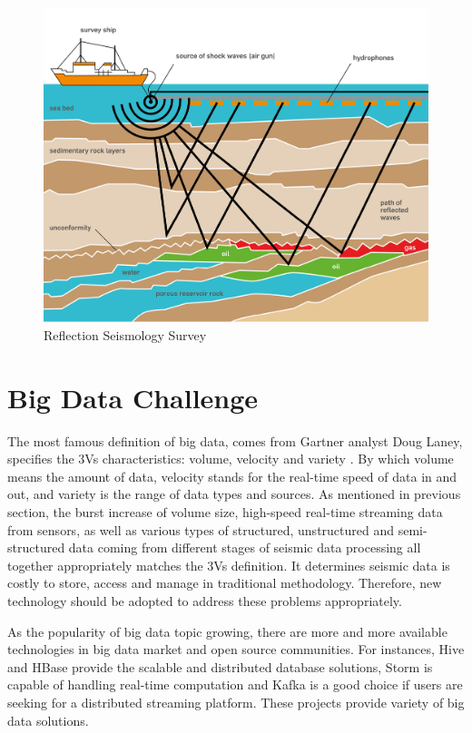 \begin{figure}[h]
\centering
\includegraphics[scale=1.0]{figures/Seissurvey.jpg}
\caption{Reflection Seismology Survey \cite{seisaov}}
\label{seismic_reflection}
\end{figure}

\section{Big Data Challenge}

The most famous definition of big data, comes from Gartner analyst Doug Laney, specifies the 3Vs characteristics: volume, velocity and variety \cite{demauro2016}. By which volume means the amount of data, velocity stands for the real-time speed of data in and out, and variety is the range of data types and sources. As mentioned in previous section,  the burst increase of volume size, high-speed real-time streaming data from sensors, as well as various types of structured, unstructured and semi-structured data coming from different stages of seismic data processing all together appropriately matches the 3Vs definition. It determines seismic data is costly to store, access and manage in traditional methodology. Therefore, new technology should be adopted to address these problems appropriately.

As the popularity of big data topic growing, there are more and more available technologies in big data market and open source communities. For instances,  Hive \cite{ApacheHive} and HBase \cite{ApacheHBase} provide the scalable and distributed database solutions, Storm \cite{ApacheStorm} is capable of handling real-time computation and Kafka \cite{ApacheKafka} is a good choice if users are seeking for a distributed streaming platform. These projects provide variety of big data solutions. 

